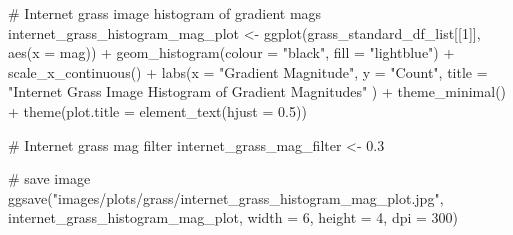 \documentclass[
  letterpaper,
  DIV=11,
  numbers=noendperiod]{scrreprt}
\newenvironment{Shaded}{\begin{snugshade}}{\end{snugshade}}
\newcommand{\AttributeTok}[1]{\textcolor[rgb]{0.40,0.45,0.13}{#1}}
\newcommand{\CommentTok}[1]{\textcolor[rgb]{0.37,0.37,0.37}{#1}}
\newcommand{\DecValTok}[1]{\textcolor[rgb]{0.68,0.00,0.00}{#1}}
\newcommand{\FloatTok}[1]{\textcolor[rgb]{0.68,0.00,0.00}{#1}}
\newcommand{\FunctionTok}[1]{\textcolor[rgb]{0.28,0.35,0.67}{#1}}
\newcommand{\NormalTok}[1]{\textcolor[rgb]{0.00,0.23,0.31}{#1}}
\newcommand{\OtherTok}[1]{\textcolor[rgb]{0.00,0.23,0.31}{#1}}
\newcommand{\SpecialCharTok}[1]{\textcolor[rgb]{0.37,0.37,0.37}{#1}}
\newcommand{\StringTok}[1]{\textcolor[rgb]{0.13,0.47,0.30}{#1}}
\begin{document}
\begin{Shaded}
\begin{Highlighting}[]
\CommentTok{\# Internet grass image histogram of gradient mags}
\NormalTok{internet\_grass\_histogram\_mag\_plot }\OtherTok{\textless{}{-}}
  \FunctionTok{ggplot}\NormalTok{(grass\_standard\_df\_list[[}\DecValTok{1}\NormalTok{]], }
         \FunctionTok{aes}\NormalTok{(}\AttributeTok{x =}\NormalTok{ mag)) }\SpecialCharTok{+}
  \FunctionTok{geom\_histogram}\NormalTok{(}\AttributeTok{colour =} \StringTok{"black"}\NormalTok{, }\AttributeTok{fill =} \StringTok{"lightblue"}\NormalTok{) }\SpecialCharTok{+}
  \FunctionTok{scale\_x\_continuous}\NormalTok{() }\SpecialCharTok{+} 
  \FunctionTok{labs}\NormalTok{(}\AttributeTok{x =} \StringTok{"Gradient Magnitude"}\NormalTok{, }
       \AttributeTok{y =} \StringTok{"Count"}\NormalTok{, }
       \AttributeTok{title =} \StringTok{"Internet Grass Image Histogram of Gradient Magnitudes"}
\NormalTok{       ) }\SpecialCharTok{+}
  \FunctionTok{theme\_minimal}\NormalTok{() }\SpecialCharTok{+}
  \FunctionTok{theme}\NormalTok{(}\AttributeTok{plot.title =} \FunctionTok{element\_text}\NormalTok{(}\AttributeTok{hjust =} \FloatTok{0.5}\NormalTok{))}

\CommentTok{\# Internet grass mag filter}
\NormalTok{internet\_grass\_mag\_filter }\OtherTok{\textless{}{-}} \FloatTok{0.3}

\CommentTok{\# save image}
\FunctionTok{ggsave}\NormalTok{(}\StringTok{"images/plots/grass/internet\_grass\_histogram\_mag\_plot.jpg"}\NormalTok{, internet\_grass\_histogram\_mag\_plot, }\AttributeTok{width =} \DecValTok{6}\NormalTok{, }\AttributeTok{height =} \DecValTok{4}\NormalTok{, }\AttributeTok{dpi =} \DecValTok{300}\NormalTok{)}
\end{Highlighting}
\end{Shaded}
\end{document}
